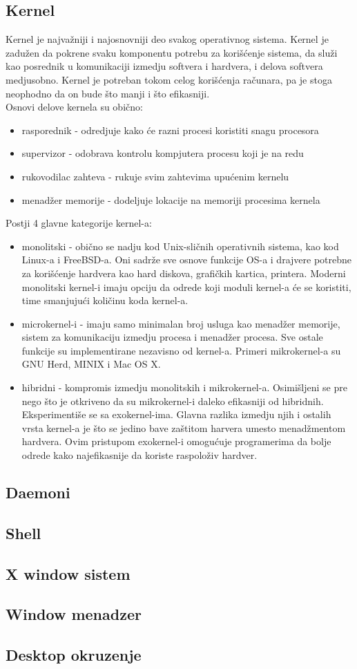 \subsection{Kernel}
Kernel je najvažniji i najosnovniji deo svakog operativnog sistema. Kernel je zadužen da pokrene svaku komponentu potrebu za korišćenje sistema, da služi kao posrednik u komunikaciji izmedju softvera i hardvera, i delova softvera medjusobno. Kernel je potreban tokom celog korišćenja računara, pa je stoga neophodno da on bude što manji i što efikasniji.\\
Osnovi delove kernela su obično:
\begin{itemize}
\item rasporednik - odredjuje kako će razni procesi koristiti snagu procesora
\item supervizor - odobrava kontrolu kompjutera procesu koji je na redu
\item rukovodilac zahteva - rukuje svim zahtevima upućenim kernelu
\item menadžer memorije - dodeljuje lokacije na memoriji procesima kernela
\end{itemize}
Postji 4 glavne kategorije kernel-a:
\begin{itemize}
\item monolitski - obično se nadju kod Unix-sličnih operativnih sistema, kao kod Linux-a i FreeBSD-a. Oni sadrže sve osnove funkcije OS-a i drajvere potrebne za korišćenje hardvera kao hard diskova, grafičkih kartica, printera. Moderni monolitski kernel-i imaju opciju da odrede koji moduli kernel-a će se koristiti, time smanjujući količinu koda kernel-a.
\item microkernel-i - imaju samo minimalan broj usluga kao menadžer memorije, sistem za komunikaciju izmedju procesa i menadžer procesa. Sve ostale funkcije su implementirane nezavisno od kernel-a. Primeri mikrokernel-a su GNU Herd, MINIX i Mac OS X.
\item hibridni - kompromis izmedju monolitskih i mikrokernel-a. Osimišljeni se pre nego što je otkriveno da su mikrokernel-i daleko efikasniji od hibridnih.
Eksperimentiše se sa exokernel-ima. Glavna razlika izmedju njih i ostalih vrsta kernel-a je što se jedino bave zaštitom harvera umesto menadžmentom hardvera. Ovim pristupom exokernel-i omogućuje programerima da bolje odrede kako najefikasnije da koriste raspoloživ hardver.
\end{itemize}
\cite{kernel}

\subsection{Daemoni}
\subsection{Shell}
\subsection{X window sistem}
\subsection{Window menadzer}
\subsection{Desktop okruzenje}